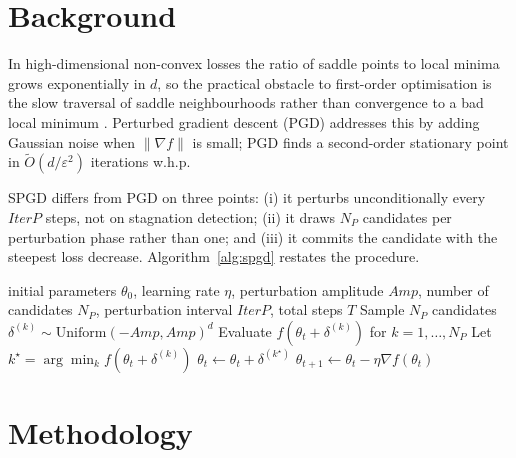 \documentclass[11pt]{article}
\newcommand{\np}{\ensuremath{N_P}}
\newcommand{\iterp}{\ensuremath{\textit{IterP}}}
\newcommand{\amp}{\ensuremath{\textit{Amp}}}
\begin{document}
\section{Background}
\label{sec:background}

In high-dimensional non-convex losses the ratio of saddle points to
local minima grows exponentially in $d$, so the practical obstacle to
first-order optimisation is the slow traversal of saddle
neighbourhoods rather than convergence to a bad local minimum
\citep{dauphin2014saddle,choromanska2015loss}.  Perturbed gradient
descent (PGD) \citep{ge2015escaping,jin2017escape} addresses this by
adding Gaussian noise when $\|\nabla f\|$ is small; PGD finds a
second-order stationary point in $\tilde O(d/\varepsilon^{2})$
iterations w.h.p.

SPGD \citep{vahedi2024spgd} differs from PGD on three points:
(i) it perturbs unconditionally every \iterp{} steps, not on
stagnation detection; (ii) it draws \np{} candidates per perturbation
phase rather than one; and (iii) it commits the candidate with the
steepest loss decrease.  Algorithm~\ref{alg:spgd} restates the
procedure.

\begin{algorithm}[!htbp]
\caption{Steepest Perturbed Gradient Descent (SPGD)}
\label{alg:spgd}
\begin{algorithmic}[1]
\Require initial parameters $\theta_0$, learning rate $\eta$, perturbation amplitude $\amp$,
         number of candidates \np{}, perturbation interval \iterp{}, total steps $T$
  \If{$t \bmod \iterp{} = 0$ \textbf{and} $t > 0$}
    \State Sample \np{} candidates $\delta^{(k)} \sim \mathrm{Uniform}(-\amp, \amp)^d$
    \State Evaluate $f(\theta_t + \delta^{(k)})$ for $k = 1, \ldots, \np{}$
    \State Let $k^\star = \arg\min_{k} f(\theta_t + \delta^{(k)})$
      \State $\theta_t \gets \theta_t + \delta^{(k^\star)}$ 
    \EndIf
  \EndIf
  \State $\theta_{t+1} \gets \theta_t - \eta \nabla f(\theta_t)$ 
\EndFor
\end{algorithmic}
\end{algorithm}

\section{Methodology}
\label{sec:methodology}
\end{document}
